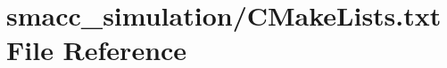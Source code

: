 \hypertarget{smacc__simulation_2CMakeLists_8txt}{}\section{smacc\+\_\+simulation/\+C\+Make\+Lists.txt File Reference}
\label{smacc__simulation_2CMakeLists_8txt}
